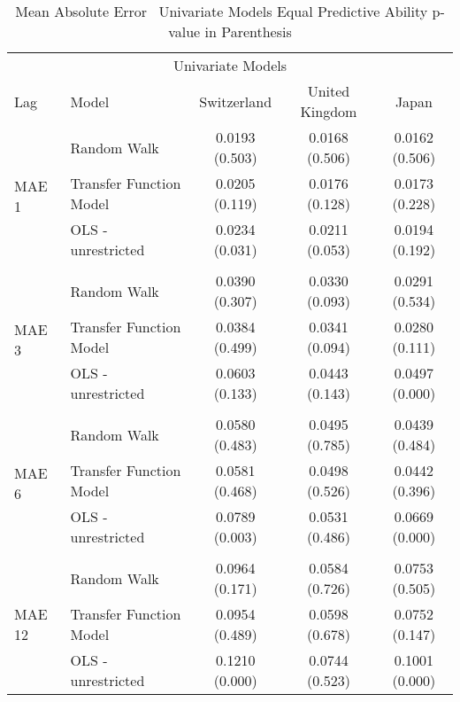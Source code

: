 \begin{table}[!ht] %
  \centering
  \caption[MAE \textendash \ Univariate Models]{Mean Absolute Error \textendash \ Univariate Models
           Equal Predictive Ability p-value in Parenthesis}
  \begin{tabular}{llccc} %
    \toprule
    \multicolumn{5}{c}{Univariate Models}                      \\
    \cmidrule(r){1-5}
    Lag                           &   Model                                     &Switzerland  & United Kingdom  & Japan\\
    \midrule
    \multirow{4}{*}{MAE 1}        & \multicolumn{1}{l}{Random Walk}             &   0.0193 (0.503) & 0.0168 (0.506) & 0.0162 (0.506)\\
                                  & \multicolumn{1}{l}{Transfer Function Model} &   0.0205 (0.119) & 0.0176 (0.128) & 0.0173 (0.228)\\ 
                                  & \multicolumn{1}{l}{OLS - unrestricted}      &   0.0234 (0.031) & 0.0211 (0.053) & 0.0194 (0.192)\\
    \\
    \multirow{4}{*}{MAE 3}        & \multicolumn{1}{l}{Random Walk}             &   0.0390 (0.307) & 0.0330 (0.093) & 0.0291 (0.534)\\ 
                                  & \multicolumn{1}{l}{Transfer Function Model} &   0.0384 (0.499) & 0.0341 (0.094) & 0.0280 (0.111)\\
                                  & \multicolumn{1}{l}{OLS - unrestricted}      &   0.0603 (0.133) & 0.0443 (0.143) & 0.0497 (0.000)\\
    \\
    \multirow{4}{*}{MAE 6}        & \multicolumn{1}{l}{Random Walk}             &   0.0580 (0.483) & 0.0495 (0.785) & 0.0439 (0.484)\\
                                  & \multicolumn{1}{l}{Transfer Function Model} &   0.0581 (0.468) & 0.0498 (0.526) & 0.0442 (0.396)\\
                                  & \multicolumn{1}{l}{OLS - unrestricted}      &   0.0789 (0.003) & 0.0531 (0.486) & 0.0669 (0.000)\\
     \\
    \multirow{4}{*}{MAE 12}       & \multicolumn{1}{l}{Random Walk}             &   0.0964 (0.171) & 0.0584 (0.726) & 0.0753 (0.505)\\
                                  & \multicolumn{1}{l}{Transfer Function Model} &   0.0954 (0.489) & 0.0598 (0.678) & 0.0752 (0.147)\\
                                  & \multicolumn{1}{l}{OLS - unrestricted}      &   0.1210 (0.000) & 0.0744 (0.523) & 0.1001 (0.000)\\
    \bottomrule
  \end{tabular}
  \label{table:MAEunivariate}
  \vspace{2em}
\end{table}

